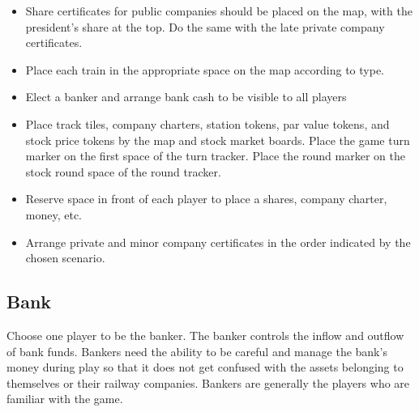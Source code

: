 \documentclass{article}
\begin{document}
\begin{CJK}{UTF8}{min}
\begin{itemize}
\item Share certificates for public companies should be placed on the
  map, with the president's share at the top. Do the same with the
  late private company certificates.

\item Place each train in the appropriate space on the map according to type.

\item Elect a banker and arrange bank cash to be visible to all players

\item Place track tiles, company charters, station tokens, par
  value tokens, and stock price tokens by the map and stock market
  boards. Place the game turn marker on the first space of the turn
  tracker. Place the round marker on the stock round space of the
  round tracker.

\item Reserve space in front of each player to place a shares, company
  charter, money, etc.

\item Arrange private and minor company certificates in the order
  indicated by the chosen scenario.

\end{itemize}









\subsection{Bank}
Choose one player to be the banker. The banker controls the inflow and
outflow of bank funds. Bankers need the ability to be careful and
manage the bank's money during play so that it does not get confused
with the assets belonging to themselves or their railway companies. Bankers are
generally the players who are familiar with the game.


\end{CJK}
\end{document}
